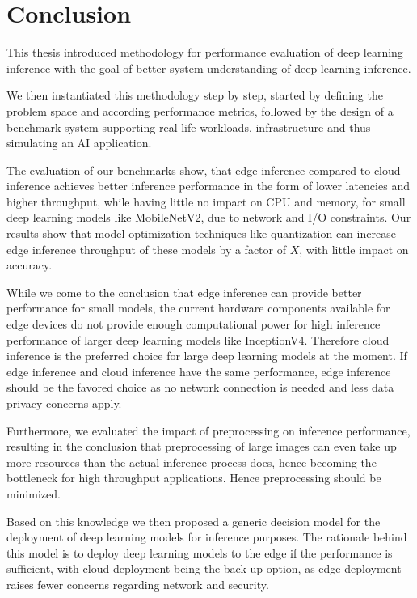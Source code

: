 \chapter{Conclusion}
\label{chap:conclusion}
%
This thesis introduced methodology for performance evaluation of deep learning inference with the goal of better system understanding of deep learning inference.

We then instantiated this methodology step by step, started by defining the problem space and according performance metrics, followed by the design of a benchmark system supporting real-life workloads, infrastructure and thus simulating an AI application.


The evaluation of our benchmarks show, that edge inference compared to cloud inference achieves better inference performance in the form of lower latencies and higher throughput, while having little no impact on CPU and memory, for small deep learning models like MobileNetV2, due to network and I/O constraints. 
Our results show that model optimization techniques like quantization can increase edge inference throughput of these models by a factor of $X$, with little impact on accuracy.

While we come to the conclusion that edge inference can provide better performance for small models, the current hardware components available for edge devices do not provide enough computational power for high inference performance of larger deep learning models like InceptionV4.
Therefore cloud inference is the preferred choice for large deep learning models at the moment.
If edge inference and cloud inference have the same performance, edge inference should be the favored choice as no network connection is needed and less data privacy concerns apply.

Furthermore, we evaluated the impact of preprocessing on inference performance, resulting in the conclusion that preprocessing of large images can even take up more resources than the actual inference process does, hence becoming the bottleneck for high throughput applications.
Hence preprocessing should be minimized.



Based on this knowledge we then proposed a generic decision model for the deployment of deep learning models for inference purposes. The rationale behind this model is to deploy deep learning models to the edge if the performance is sufficient, with cloud deployment being the back-up option, as edge deployment raises fewer concerns regarding network and security.

